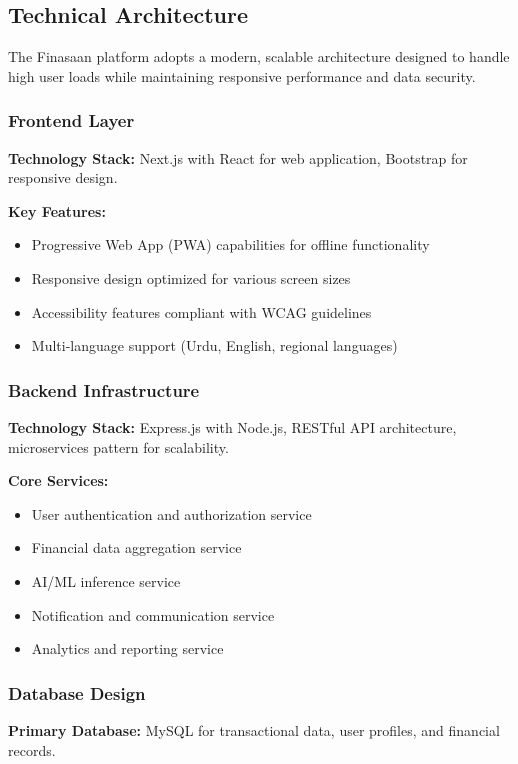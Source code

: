 \documentclass[conference]{IEEEtran}
\begin{document}
\subsection{Technical Architecture}

The Finasaan platform adopts a modern, scalable architecture designed to handle high user loads while maintaining responsive performance and data security.

\subsubsection{Frontend Layer}
\textbf{Technology Stack:} Next.js with React for web application, Bootstrap for responsive design.

\textbf{Key Features:}
\begin{itemize}
    \item Progressive Web App (PWA) capabilities for offline functionality
    \item Responsive design optimized for various screen sizes
    \item Accessibility features compliant with WCAG guidelines
    \item Multi-language support (Urdu, English, regional languages)
\end{itemize}

\subsubsection{Backend Infrastructure}
\textbf{Technology Stack:} Express.js with Node.js, RESTful API architecture, microservices pattern for scalability.

\textbf{Core Services:}
\begin{itemize}
    \item User authentication and authorization service
    \item Financial data aggregation service
    \item AI/ML inference service
    \item Notification and communication service
    \item Analytics and reporting service
\end{itemize}

\subsubsection{Database Design}
\textbf{Primary Database:} MySQL for transactional data, user profiles, and financial records.
\end{document}
